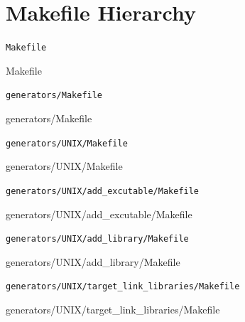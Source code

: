 \section{Makefile Hierarchy}

{\tt Makefile}

 {Makefile}

{\tt generators/Makefile}

 {generators/Makefile}

{\tt generators/UNIX/Makefile}

 {generators/UNIX/Makefile}

{\tt generators/UNIX/add\_excutable/Makefile}

 {generators/UNIX/add_excutable/Makefile}

{\tt generators/UNIX/add\_library/Makefile}

 {generators/UNIX/add_library/Makefile}

{\tt generators/UNIX/target\_link\_libraries/Makefile}

 {generators/UNIX/target_link_libraries/Makefile}
